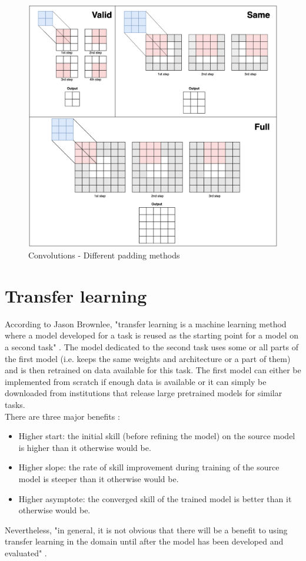 \begin{figure}[!h]
\centering
\includegraphics[width=1\textwidth, keepaspectratio=true]{./figures/convolution_padding.png}
\caption{Convolutions - Different padding methods}
\label{fig:convolution_padding}
\end{figure}



\section{Transfer learning}

According to Jason Brownlee, "transfer learning is a machine learning method where a model developed for a task is reused as the starting point for a model on a second task" \cite{30}. The model dedicated to the second task uses some or all parts of the first model (i.e. keeps the same weights and architecture or a part of them) and is then retrained on data available for this task. The first model can either be implemented from scratch if enough data is available or it can simply be downloaded from institutions that release large pretrained models for similar tasks.\\
There are three major benefits \cite{30}:
\begin{itemize}
\item Higher start: the initial skill (before refining the model) on the source model is higher than it otherwise would be.
\item Higher slope: the rate of skill improvement during training of the source model is steeper than it otherwise would be.
\item Higher asymptote: the converged skill of the trained model is better than it otherwise would be.
\end{itemize}
Nevertheless, "in general, it is not obvious that there will be a benefit to using transfer learning in the domain until after the model has been developed and evaluated" \cite{30}.

